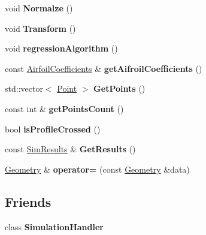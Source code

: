 \begin{DoxyCompactItemize}
\item 
\hypertarget{class_geometry_a2019d3e286dde947dd93461a63da9e65}{}\label{class_geometry_a2019d3e286dde947dd93461a63da9e65} 
void {\bfseries Normalze} ()
\item 
\hypertarget{class_geometry_a4a17704dc3342c65ee95b3352ab754ca}{}\label{class_geometry_a4a17704dc3342c65ee95b3352ab754ca} 
void {\bfseries Transform} ()
\item 
\hypertarget{class_geometry_a824e4bc80a6c08fd47d341fae8e67857}{}\label{class_geometry_a824e4bc80a6c08fd47d341fae8e67857} 
void {\bfseries regression\+Algorithm} ()
\item 
\hypertarget{class_geometry_a8db11be460efd0624647e031d6a388dc}{}\label{class_geometry_a8db11be460efd0624647e031d6a388dc} 
const \hyperlink{struct_airfoil_coefficients}{Airfoil\+Coefficients} \& {\bfseries get\+Aifroil\+Coefficients} ()
\item 
\hypertarget{class_geometry_a814f031a36718636be0491ce8618488b}{}\label{class_geometry_a814f031a36718636be0491ce8618488b} 
std\+::vector$<$ \hyperlink{class_point}{Point} $>$ {\bfseries Get\+Points} ()
\item 
\hypertarget{class_geometry_a99a0a6e2dfb453eb224cc8f01e75b7b0}{}\label{class_geometry_a99a0a6e2dfb453eb224cc8f01e75b7b0} 
const int \& {\bfseries get\+Points\+Count} ()
\item 
\hypertarget{class_geometry_a354dfd9d846b58dbd3a1090ea4227e33}{}\label{class_geometry_a354dfd9d846b58dbd3a1090ea4227e33} 
bool {\bfseries is\+Profile\+Crossed} ()
\item 
\hypertarget{class_geometry_a45255bffe9b2d5511cdb79b63532f0a1}{}\label{class_geometry_a45255bffe9b2d5511cdb79b63532f0a1} 
const \hyperlink{class_sim_results}{Sim\+Results} \& {\bfseries Get\+Results} ()
\item 
\hypertarget{class_geometry_aada258eedf595527f097faed460a5521}{}\label{class_geometry_aada258eedf595527f097faed460a5521} 
\hyperlink{class_geometry}{Geometry} \& {\bfseries operator=} (const \hyperlink{class_geometry}{Geometry} \&data)
\end{DoxyCompactItemize}
\subsection*{Friends}
\begin{DoxyCompactItemize}
\item 
\hypertarget{class_geometry_a88881bfc7b707b9bf91fd177fefa2e04}{}\label{class_geometry_a88881bfc7b707b9bf91fd177fefa2e04} 
class {\bfseries Simulation\+Handler}
\end{DoxyCompactItemize}


